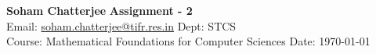 \documentclass[a4paper, 11pt]{article}
\begin{document}
	
	
	{\noindent \large\textbf{Soham Chatterjee} \hfill \textbf{Assignment - 2}\\
		Email: \href{soham.chatterjee@tifr.res.in}{soham.chatterjee@tifr.res.in} \hfill Dept: STCS\\
		\normalsize Course: Mathematical Foundations for Computer Sciences \hfill Date: \today}
	
	
\end{document}
